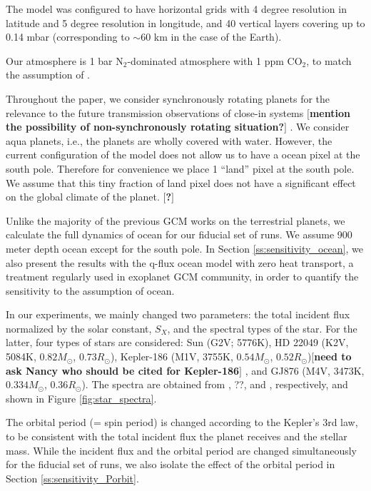 \documentclass[11pt,numberedappendix,twocolappendix,]{emulateapj}
\def\memo#1{\color{red}$[${\bf #1}$]$ \color{black}}
\begin{document}
The model was configured to have horizontal grids with 4 degree resolution in latitude and 5 degree resolution in longitude, and 40 vertical layers covering up to 0.14 mbar (corresponding to $\sim 60$ km in the case of the Earth). 

Our atmosphere is 1 bar N$_2$-dominated atmosphere with 1 ppm CO$_2$, to match the assumption of \citet{Kopparapu2016}. 

Throughout the paper, we consider synchronously rotating planets for the relevance to the future transmission observations of close-in systems \memo{mention the possibility of non-synchronously rotating situation?}. 
We consider aqua planets, i.e., the planets are wholly covered with water. 
However, the current configuration of the model does not allow us to have a ocean pixel at the south pole. Therefore for convenience we place 1 ``land'' pixel at the south pole. We assume that this tiny fraction of land pixel does not have a significant effect on the global climate of the planet. \memo{?}

Unlike the majority of the previous GCM works on the terrestrial planets, we calculate the full dynamics of ocean for our fiducial set of runs. 
We assume 900 meter depth ocean except for the south pole. 
In Section \ref{ss:sensitivity_ocean}, we also present the results with the q-flux ocean model with zero heat transport, a treatment regularly used in exoplanet GCM community, in order to quantify the sensitivity to the assumption of ocean. 

In our experiments, we mainly changed two parameters: the total incident flux normalized by the solar constant, $S_X$, and the spectral types of the star. 
For the latter, four types of stars are considered: 
Sun (G2V; 5776K), 
HD 22049 (K2V, 5084K, $0.82M_{\odot }$, $0.73R_{\odot }$), 
Kepler-186 (M1V, 3755K, $0.54M_{\odot }$, $0.52R_{\odot }$)\memo{need to ask Nancy who should be cited for Kepler-186}, and 
GJ876 (M4V, 3473K, $0.334M_{\odot }$, $0.36R_{\odot }$). 
The spectra are obtained from \citet{Segura2003}, ??, and \citet{Domagal-Goldman2014}, respectively, and shown in Figure \ref{fig:star_spectra}. 

The orbital period (= spin period) is changed according to the Kepler's 3rd law, to be consistent with the total incident flux the planet receives and the stellar mass. While the incident flux and the orbital period are changed simultaneously for the fiducial set of runs, we also isolate the effect of the orbital period in Section \ref{ss:sensitivity_Porbit}. 
\end{document}
